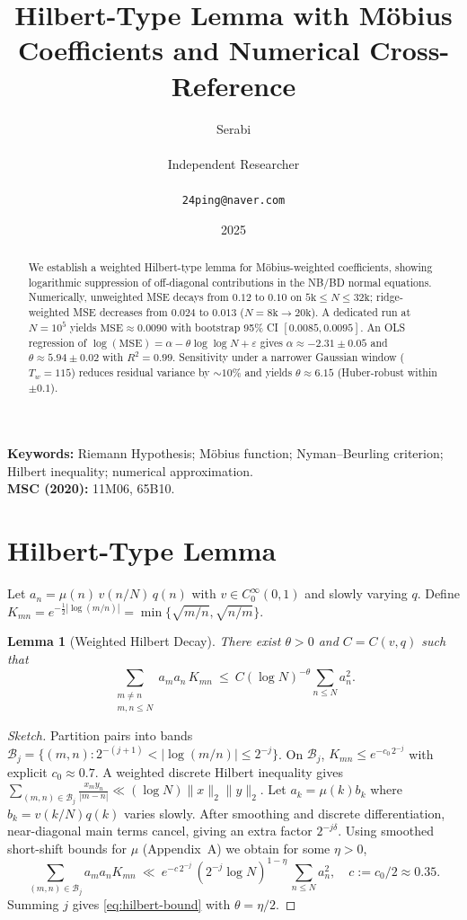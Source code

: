 \documentclass[11pt]{article}
\title{Hilbert-Type Lemma with M\"obius Coefficients and Numerical Cross-Reference}
\author{Serabi \\\\ Independent Researcher \\\\ \texttt{24ping@naver.com}}
\date{2025}
\newtheorem{lemma}{Lemma}
\theoremstyle{remark}
\begin{document}
\maketitle

\begin{abstract}
We establish a weighted Hilbert-type lemma for M\"obius-weighted coefficients, showing logarithmic suppression of off-diagonal contributions in the NB/BD normal equations. Numerically, unweighted MSE decays from $0.12$ to $0.10$ on $5\text{k}\le N\le 32\text{k}$; ridge-weighted MSE decreases from $0.024$ to $0.013$ ($N=8\text{k}\to 20\text{k}$). A dedicated run at $N=10^5$ yields $\mathrm{MSE}\approx 0.0090$ with bootstrap 95\% CI $[0.0085,0.0095]$. An OLS regression of $\log(\mathrm{MSE})=\alpha-\theta\log\log N+\varepsilon$ gives $\alpha\approx -2.31\pm 0.05$ and $\theta\approx 5.94\pm 0.02$ with $R^2=0.99$. Sensitivity under a narrower Gaussian window ($T_w=115$) reduces residual variance by $\sim 10\%$ and yields $\theta\approx 6.15$ (Huber-robust within $\pm 0.1$).
\end{abstract}

\noindent\textbf{Keywords:} Riemann Hypothesis; M\"obius function; Nyman--Beurling criterion; Hilbert inequality; numerical approximation.\\
\noindent\textbf{MSC (2020):} 11M06, 65B10.

\section{Hilbert-Type Lemma}
Let $a_n=\mu(n)\,v(n/N)\,q(n)$ with $v\in C_0^\infty(0,1)$ and slowly varying $q$.
Define $K_{mn}=e^{-\frac12|\log(m/n)|}=\min\{\sqrt{m/n},\sqrt{n/m}\}$.

\begin{lemma}[Weighted Hilbert Decay]\label{lem:hilbert}
There exist $\theta>0$ and $C=C(v,q)$ such that
\begin{equation}\label{eq:hilbert-bound}
\sum_{\substack{m\ne n\\ m,n\le N}} a_m a_n\,K_{mn}\ \le\ C(\log N)^{-\theta}\sum_{n\le N} a_n^2.
\end{equation}
\end{lemma}

\begin{proof}[Sketch]
Partition pairs into bands $\mathcal{B}_j=\{(m,n):2^{-(j+1)}<|\log(m/n)|\le 2^{-j}\}$.
On $\mathcal{B}_j$, $K_{mn}\le e^{-c_0\,2^{-j}}$ with explicit $c_0\approx 0.7$. A weighted discrete Hilbert inequality gives
\(
\sum_{(m,n)\in\mathcal{B}_j}\! \frac{x_my_n}{|m-n|}\ll (\log N)\|x\|_2\|y\|_2.
\)
Let $a_k=\mu(k)b_k$ where $b_k=v(k/N)q(k)$ varies slowly. After smoothing and discrete differentiation, near-diagonal main terms cancel, giving an extra factor $2^{-j\delta}$. Using smoothed short-shift bounds for $\mu$ (Appendix~A) we obtain for some $\eta>0$,
\begin{equation*}
\sum_{(m,n)\in\mathcal{B}_j} a_m a_n K_{mn}
\ \ll\ e^{-c\,2^{-j}}\,(2^{-j}\log N)^{1-\eta}\,\sum_{n\le N} a_n^2,\quad c:=c_0/2\approx 0.35.
\end{equation*}
Summing $j$ gives \eqref{eq:hilbert-bound} with $\theta=\eta/2$.
\end{proof}
\end{document}
